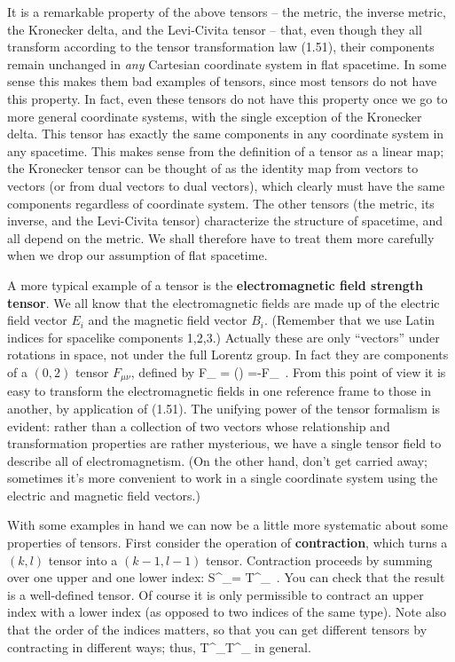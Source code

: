 It is a remarkable property of the above tensors -- the metric, the inverse
metric, the Kronecker delta, and the Levi-Civita tensor -- that, even though
they all transform according to the tensor transformation law (1.51), their
components remain unchanged in {\it any} Cartesian coordinate system in
flat spacetime.  In some sense this makes them bad examples of tensors, since
most tensors do not have this property.  In fact, even these tensors do not
have this property once we go to more general coordinate systems, with the
single exception of the Kronecker delta.  This tensor has exactly the same
components in any coordinate system in any spacetime.  This makes sense
from the definition of a tensor as a linear map; the Kronecker tensor can
be thought of as the identity map from vectors to vectors (or from dual
vectors to dual vectors), which clearly must have the same components
regardless of coordinate system.  The other tensors (the metric, its inverse,
and the Levi-Civita tensor) characterize the structure of spacetime, and
all depend on the metric.  We shall therefore have to treat them more
carefully when we drop our assumption of flat spacetime.

A more typical example of a tensor is the {\bf electromagnetic field
strength tensor}.  We all know that the electromagnetic fields are made up
of the electric field vector $E_i$ and the magnetic field vector $B_i$.
(Remember that we use Latin indices for spacelike components 1,2,3.)
Actually these are only ``vectors'' under rotations in space, not under
the full Lorentz group.  In fact they are components of a $(0,2)$
tensor $F_{\mu\nu}$, defined by
\be
  F_{\mu\nu} = \left(\right)
  =-F_{\nu\mu}\ .\label{1.58}
\ee
From this point of view it is easy to transform the electromagnetic
fields in one reference frame to those in another, by application of (1.51).
The unifying power of the tensor formalism is evident: rather than a
collection of two vectors whose relationship and transformation
properties are rather mysterious, we have a single tensor field to
describe all of electromagnetism.  (On the other hand, don't get 
carried away; sometimes it's more convenient to work in a single
coordinate system using the electric and magnetic field vectors.)

With some examples in hand we can now be a little more systematic 
about some properties of tensors.  First consider the operation of
{\bf contraction}, which turns a $(k,l)$ tensor into a $(k-1,l-1)$
tensor.  Contraction proceeds by summing over one upper and one lower
index:
\be
  S^{\mu\rho}{}_\sigma = T^{\mu\nu\rho}{}_{\sigma\nu}\ .\label{1.59}
\ee
You can check that the result is a well-defined tensor.  Of course it
is only permissible to contract an upper index with a lower index (as
opposed to two indices of the same type).  Note also that the order
of the indices matters, so that you can get different tensors by
contracting in different ways; thus,
\be
  T^{\mu\nu\rho}{}_{\sigma\nu}\neq T^{\mu\rho\nu}{}_{\sigma\nu}
  \label{1.60}
\ee
in general.


